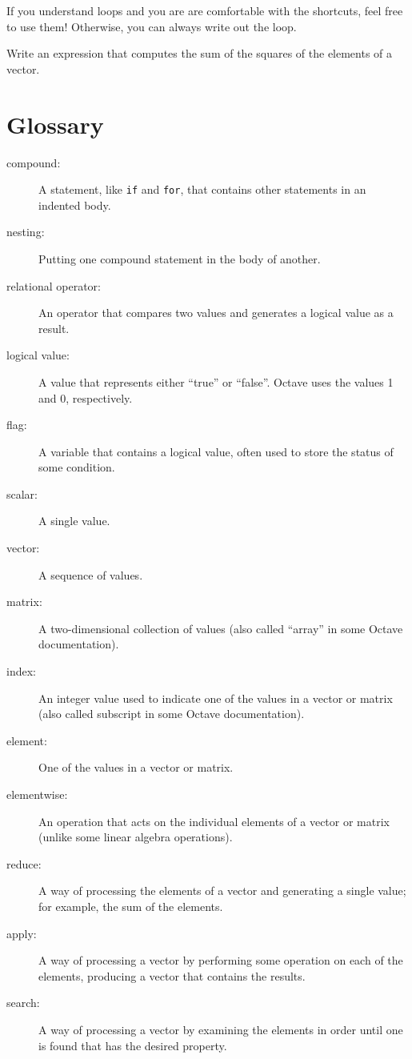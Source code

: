 \documentclass{book}
\begin{document}
If you understand loops and you are are comfortable with the
shortcuts, feel free to use them! Otherwise, you can always write
out the loop.

\begin{ex}
Write an expression that computes the sum of the
squares of the elements of a vector.
\end{ex}


\section{Glossary}

\begin{description}

\item[compound:] A statement, like {\tt if} and {\tt for}, that
contains other statements in an indented body.

\item[nesting:] Putting one compound statement in the body of another.

\item[relational operator:] An operator that compares two values and
generates a logical value as a result.

\item[logical value:] A value that represents either ``true'' or
``false''. Octave uses the values 1 and 0, respectively.

\item[flag:] A variable that contains a logical value, often used
to store the status of some condition.

\item[scalar:] A single value.

\item[vector:] A sequence of values.

\item[matrix:] A two-dimensional collection of values (also called
``array'' in some Octave documentation).

\item[index:] An integer value used to indicate one of the values
in a vector or matrix (also called subscript in some Octave documentation).

\item[element:] One of the values in a vector or matrix.

\item[elementwise:] An operation that acts on the individual elements
of a vector or matrix (unlike some linear algebra operations).

\item[reduce:] A way of processing the elements of a vector and
generating a single value; for example, the sum of the elements.

\item[apply:] A way of processing a vector by performing some operation
on each of the elements, producing a vector that contains the
results.

\item[search:] A way of processing a vector by examining the
elements in order until one is found that has the desired property.

\end{description}
\end{document}
